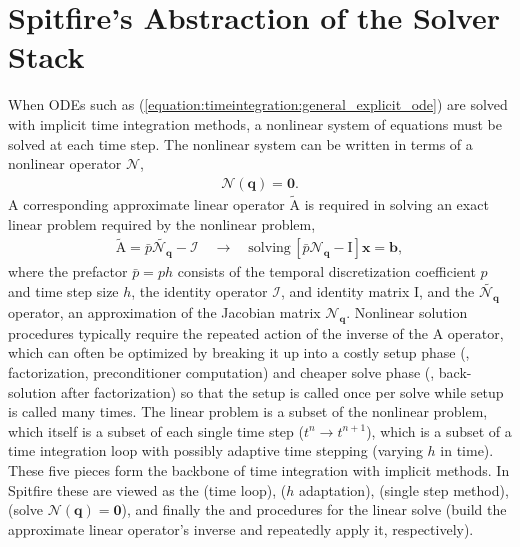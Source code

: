 \documentclass[letterpaper,10pt,english]{sphinxmanual}
\begin{document}
\section{Spitfire’s Abstraction of the Solver Stack}
\label{\detokenize{timeintegration:spitfire-s-abstraction-of-the-solver-stack}}
When ODEs such as (\ref{equation:timeintegration:general_explicit_ode}) are solved with implicit time integration methods, a nonlinear system of equations must be solved at each time step.
The nonlinear system can be written in terms of a nonlinear operator \(\boldsymbol{\mathcal{N}}\),
\begin{equation}\label{equation:timeintegration:eqn: simple nlin}
\begin{split}\boldsymbol{\mathcal{N}}(\boldsymbol{q}) = \boldsymbol{0}.\end{split}
\end{equation}
A corresponding approximate linear operator \(\widetilde{\mathrm{A}}\) is required in solving an exact linear problem required by the nonlinear problem,
\begin{equation}\label{equation:timeintegration:eqn: simple lin}
\begin{split}\widetilde{\mathrm{A}} = \bar{p}\widetilde{\boldsymbol{\mathcal{N}}_{\boldsymbol{q}}} - \mathcal{I} \quad \rightarrow \quad \mathrm{solving}\, \left[\bar{p}\boldsymbol{\mathcal{N}}_{\boldsymbol{q}} - \mathrm{I}\right]\boldsymbol{x}=\boldsymbol{b},\end{split}
\end{equation}
where the prefactor \(\bar{p}=ph\) consists of the temporal discretization coefficient \(p\) and time step size \(h\), the identity operator \(\mathcal{I}\), and identity matrix \(\mathrm{I}\), and the \(\widetilde{\boldsymbol{\mathcal{N}}_{\boldsymbol{q}}}\) operator, an approximation of the Jacobian matrix \(\boldsymbol{\mathcal{N}}_{\boldsymbol{q}}\).
Nonlinear solution procedures typically require the repeated action of the inverse of the \(\mathrm{A}\) operator, which can often be optimized by breaking it up into a costly setup phase (, factorization, preconditioner computation) and cheaper solve phase (, back-solution after factorization) so that the setup is called once per solve while setup is called many times.
The linear problem is a subset of the nonlinear problem, which itself is a subset of each single time step (\(t^n\to t^{n+1}\)), which is a subset of a time integration loop with possibly adaptive time stepping (varying \(h\) in time).
These five pieces form the backbone of time integration with implicit methods.
In Spitfire these are viewed as the  (time loop),  (\(h\) adaptation),  (single step method),  (solve \(\boldsymbol{\mathcal{N}}(\boldsymbol{q}) = \boldsymbol{0}\)), and finally the  and  procedures for the linear solve (build the approximate linear operator’s inverse and repeatedly apply it, respectively).
\end{document}

